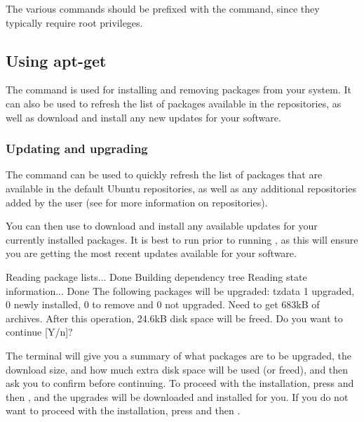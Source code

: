The various  commands should be prefixed with the  
command, since they typically require root privileges.

\subsection{Using apt-get}

The  command is used for installing and removing packages from your system. It can also be used to refresh the list of packages available in the repositories, as well as download and install any new updates for your software.

\subsubsection{Updating and upgrading} 

The   command can be used to quickly
refresh the list of packages that are available in the default Ubuntu
repositories, as well as any additional repositories added by the user (see
 for more information on repositories).

\begin{terminal}
\prompt {}
\end{terminal}

You can then use   to download and
install any available updates for your currently installed packages. It is best
to run   prior to running
 , as this will ensure you are getting
the most recent updates available for your software.

\begin{terminal}
\prompt {}
Reading package lists... Done
Building dependency tree       
Reading state information... Done
The following packages will be upgraded:
\space\space tzdata
1 upgraded, 0 newly installed, 0 to remove and 0 not upgraded.
Need to get 683kB of archives.
After this operation, 24.6kB disk space will be freed.
Do you want to continue [Y/n]? 
\end{terminal}

The terminal will give you a summary of what packages are to be upgraded, the download size, and how much extra disk space will be used (or freed), and then ask you to confirm before continuing. To proceed with the installation, press  and then , and the upgrades will be downloaded and installed for you. If you do not want to proceed with the installation, press  and then .

